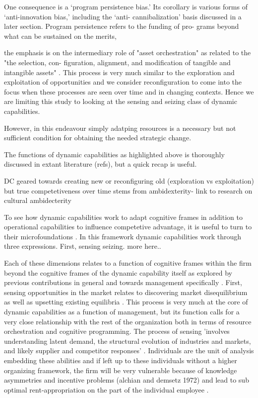 One consequence is a ‘program persistence bias.’ Its corollary is various forms of
‘anti-innovation bias,’ including the ‘anti- cannibalization’ basis discussed in a later
section. Program persistence refers to the funding of pro- grams beyond what can be
sustained on the merits,

the emphasis is on the intermediary role of "asset
orchestration" \citep{Teece2012,Sirmon2011} as related to the "the selection, con-
figuration, alignment, and modification of tangible and intangible assets"
\citep[p.842]{Helfat2015}. This process is very much similar to the exploration and
exploitation of opportunities and we consider reconfiguration to come into the focus when
these processes are seen over time and in changing contexts. Hence we are limiting this
study to looking at the sensing and seizing class of dynamic capabilities.



However, in this endeavour
simply adatping resources is a necessary but not sufficient condition for obtaining the
needed strategic change.   

The functions of dynamic capabilities as highlighted above is thoroughly discussed in
extant literature (refs), but a quick recap is useful. 

DC geared towards creating new or reconfiguring old (exploration vs exploitation) but true
competetiveness over time stems from ambidexterity- link to research on cultural ambidecterity


To see how dynamic capabilities work to adapt cognitive frames in addition to operational
capabilities to influence competetive advantage, it is useful to turn to their
microfoundations \citep{Teece2007}. In this framework dynamic capabilities work through
three expressions. First, sensing seizing. more here..

Each of these dimensions relates to a function of cognitive frames within the firm beyond
the cognitive frames of the dynamic capability itself as explored by previous
contributions in general \citep{Teece2007} and towards management specifically
\citep{Helfat2015,Helfat2015a}. First, sensing opportunities in the market relates to
discovering market disequilibrium \citep{Kirzner1997} as well as upsetting existing
equilibria \citep{Schumpeter1934}. This process is very much at the core of dynamic
capabilities as a function of management, but its function calls for a very close
relationship with the rest of the organization both in terms of resource orchestration and
cognitive programming. The process of sensing 'involves understanding latent demand, the
structural evolution of industries and markets, and likely supplier and competitor
responses' \citep[p. 1322]{Teece2007}. Individuals are the unit of analysis embedding
these abilities and if left up to these individuals without a higher organizing
framework, the firm will be very vulnerable because of knowledge asymmetries and incentive
problems (alchian and demsetz 1972) and lead to sub optimal rent-appropriation on the part
of the individual employee \citep{Blyler2003}. 

